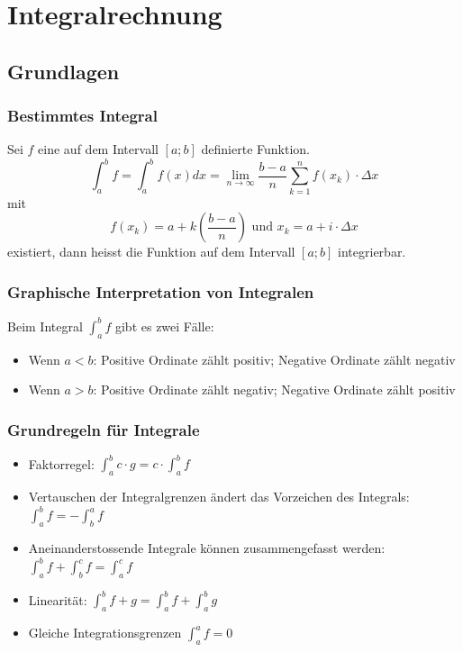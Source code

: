 \section{Integralrechnung}
\subsection{Grundlagen}
\subsubsection{Bestimmtes Integral}
Sei $f$ eine auf dem Intervall $[a;b]$ definierte Funktion.
\[ \int^b_a f = \int^b _a f(x) dx =
  \lim_{n \to \infty} \frac{b-a}{n} \sum_{k=1}^{n}f(x_k) \cdot \Delta x
\]
mit
\[ f(x_k) = a + k\left(\frac{b-a}{n}\right) \text{ und }
  x_k = a + i \cdot \Delta x\]
existiert, dann heisst die Funktion auf dem Intervall $[a;b]$
integrierbar.

\subsubsection{Graphische Interpretation von Integralen}
Beim Integral $\int_{a}^{b}f$ gibt es zwei Fälle:
\begin{itemize}
  \item Wenn $a < b$: Positive Ordinate zählt positiv;
    Negative Ordinate zählt negativ
  \item Wenn $a > b$: Positive Ordinate zählt negativ;
    Negative Ordinate zählt positiv
\end{itemize}

\subsubsection{Grundregeln für Integrale}
\begin{itemize}
  \item Faktorregel: $\int_{a}^{b}c \cdot g = c \cdot \int_{a}^{b}f$
  \item Vertauschen der Integralgrenzen ändert das Vorzeichen des Integrals:
    $\int_{a}^{b}f = - \int_{b}^{a}f$
  \item Aneinanderstossende Integrale können zusammengefasst werden:
    $\int_{a}^{b}f + \int_{b}^{c}f = \int_{a}^{c}f$
  \item Linearität: $\int_{a}^{b}f+g = \int_{a}^{b}f + \int_{a}^{b}g$
  \item Gleiche Integrationsgrenzen $\int_{a}^{a} f = 0$
\end{itemize}

